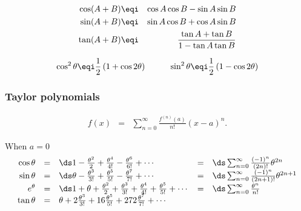 \begin{eqnarray*}
   \cos(A+B)    &\eqi& \cos A \cos B - \sin A \sin B  \\
   \sin(A+B)    &\eqi& \sin A \cos B + \cos A \sin B  \\
   \tan(A+B)    &\eqi& \frac{\tan A + \tan B}{1 - \tan A \tan B} \\
\end{eqnarray*}

\[ \cos^2\theta \eqi \frac{1}{2} \left( 1 + \cos2\theta \right) \hspace{1cm}
   \sin^2\theta \eqi \frac{1}{2} \left( 1 - \cos2\theta \right) 
\]


\subsubsection*{Taylor polynomials}
\begin{eqnarray*}
   f(x) &=& \sum_{n=0}^\infty \frac{f^{(n)}(a)}{n!}(x-a)^n.
\end{eqnarray*}

When $a=0$ 
\[\begin{array}{rclcl}
   \cos\theta 
     &=& \ds 1 - \frac{\theta^2}{2} + \frac{\theta^4}{4!} - \frac{\theta^6}{6!} + \cdots 
     &=& \ds \sum_{n=0}^\infty \frac{(-1)^n}{(2n)!}\theta^{2n}
\\
   \sin\theta 
     &=& \ds \theta - \frac{\theta^3}{3!} + \frac{\theta^5}{5!} - \frac{\theta^7}{7!} + \cdots 
     &=& \ds \sum_{n=0}^\infty \frac{(-1)^n}{(2n+1)!}\theta^{2n+1}
\\
   e^\theta
     &=& \ds 1 + \theta + \frac{\theta^2}{2} + \frac{\theta^3}{3!} + \frac{\theta^4}{4!} + \frac{\theta^5}{5!} + \cdots
     &=& \ds \sum_{n=0}^\infty \frac{\theta^n}{n!}
\\
   \tan\theta 
     &=& \theta + 2\frac{\theta^3}{3!} + 16\frac{\theta^5}{5!} + 272\frac{\theta^7}{7!} + \cdots \\
\end{array}\]

